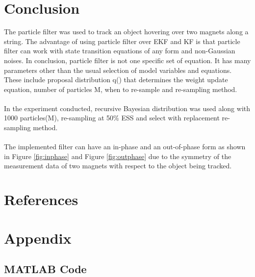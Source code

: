 \documentclass[12pt]{article}
\begin{document}
\section{Conclusion}
The particle filter was used to track an object hovering over two magnets along a string. The advantage of using particle filter over EKF and KF is that particle filter can work with state transition equations of any form and non-Gaussian noises. In conclusion, particle filter is not one specific set of equation. It has many parameters other than the usual selection of model variables and equations. These include proposal distribution q() that determines the weight update equation, number of particles M, when to re-sample and re-sampling method. \\
\\
In the experiment conducted, recursive Bayesian distribution was used along with 1000 particles(M), re-sampling at 50\% ESS and select with replacement re-sampling method. \\
\\
The implemented filter can have an in-phase and an out-of-phase form as shown in Figure \ref{fig:inphase} and Figure \ref{fig:outphase} due to the symmetry of the measurement data of two magnets with respect to the object being tracked.
\section*{References}
\newpage
\section*{Appendix}

\subsection*{MATLAB Code}
%
\end{document}
